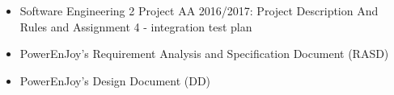 \begin{itemize}
	\item Software Engineering 2 Project AA 2016/2017: Project Description And Rules and Assignment 4 - integration test plan
	\item PowerEnJoy's Requirement Analysis and Specification Document (RASD)
	\item PowerEnJoy's Design Document (DD)
\end{itemize}